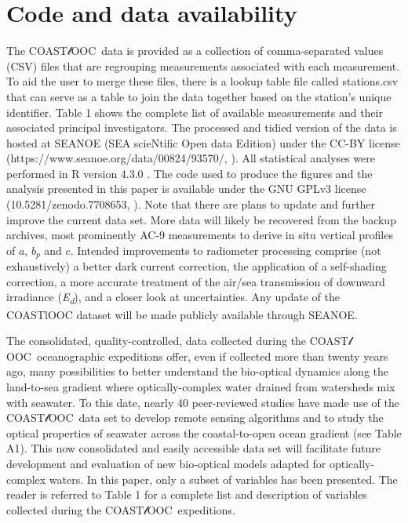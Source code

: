 \documentclass[essd, manuscript]{copernicus}
\newcommand{\coastlooc}{COAST$\mathscr{l}$OOC~\allowbreak}
\begin{document}
\section{Code and data availability}

The \coastlooc data is provided as a collection of comma-separated values (CSV) files that are regrouping measurements associated with each measurement. To aid the user to merge these files, there is a lookup table file called stations.csv that can serve as a table to join the data together based on the station's unique identifier. Table 1 shows the complete list of available measurements and their associated principal investigators. The processed and tidied version of the data is hosted at SEANOE (SEA scieNtific Open data Edition) under the CC-BY license (https://www.seanoe.org/data/00824/93570/, \citealt{Massicotte2023a}). All statistical analyses were performed in R version 4.3.0 \citep{RCoreTeam2022}. The code used to produce the figures and the analysis presented in this paper is available under the GNU GPLv3 license (10.5281/zenodo.7708653, \citealt{Massicotte2023}). Note that there are plans to update and further improve the current data set. More data will likely be recovered from the backup archives, most prominently AC-9 measurements to derive in situ vertical profiles of $a$, $b_p$ and $c$. Intended improvements to radiometer processing comprise (not exhaustively) a better dark current correction, the application of a self-shading correction, a more accurate treatment of the air/sea transmission of downward irradiance (\textit{E\textsubscript{d}}), and a closer look at uncertainties. Any update of the COASTlOOC dataset will be made publicly available through SEANOE.

\conclusions  %

The consolidated, quality-controlled, data collected during the \coastlooc oceanographic expeditions offer, even if collected more than twenty years ago, many possibilities to better understand the bio-optical dynamics along the land-to-sea gradient where optically-complex water drained from watersheds mix with seawater. To this date, nearly 40 peer-reviewed studies have made use of the \coastlooc data set to develop remote sensing algorithms and to study the optical properties of seawater across the coastal-to-open ocean gradient (see Table A1). This now consolidated and easily accessible data set will facilitate future development and evaluation of new bio-optical models adapted for optically-complex waters. In this paper, only a subset of variables has been presented. The reader is referred to Table 1 for a complete list and description of variables collected during the \coastlooc expeditions.
\end{document}
